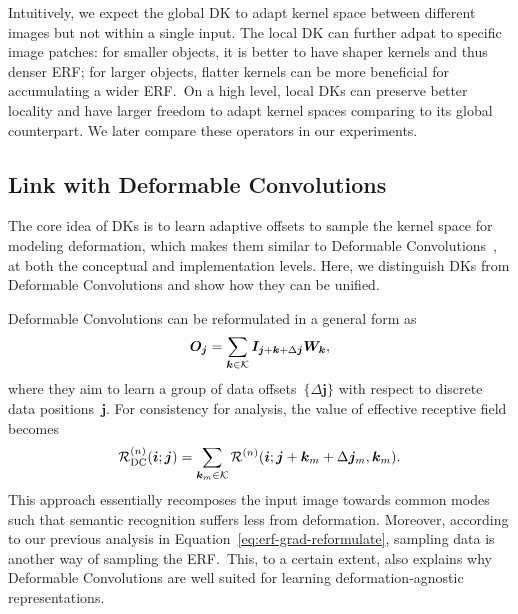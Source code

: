 \documentclass{article} \usepackage{iclr2020_conference, times}
\def\vi{{\bm{i}}}
\def\vj{{\bm{j}}}
\def\vk{{\bm{k}}}
\def\mI{{\bm{I}}}
\def\mO{{\bm{O}}}
\def\mW{{\bm{W}}}
\def\gK{{\mathcal{K}}}
\def\gR{{\mathcal{R}}}
\begin{document}
Intuitively, we expect the global DK to adapt kernel space between different
images but not within a single input.
The local DK can further adpat to specific image patches: for smaller objects,
it is better to have shaper kernels and thus denser ERF; for larger objects,
flatter kernels can be more beneficial for accumulating a wider ERF.\
On a high level, local DKs can preserve better locality and have larger freedom
to adapt kernel spaces comparing to its global counterpart.
We later compare these operators in our experiments.


\subsection{Link with Deformable Convolutions} \label{sec:dcn}
The core idea of DKs is to learn adaptive offsets to sample the kernel space for
modeling deformation, which makes them similar to Deformable
Convolutions~\citep{dai2017deformable,zhu2019deformable}, at both the conceptual and
implementation levels.
Here, we distinguish DKs from Deformable Convolutions and show how they can be unified.

Deformable Convolutions can be reformulated in a general form as
\begin{equation}
\small
    \label{eq:dc2d}
    \mO_{\vj} =
    \sum_{\vk \in \gK} \mI_{\vj + \vk + \Delta \vj} \mW_{\vk},
\end{equation}
where they aim to learn a group of data offsets~$\{\Delta \vj\}$
with respect to discrete data positions~$\vj$.
For consistency for analysis, the value of effective receptive field becomes
\begin{equation}
\small
    \label{eq:erf-grad-dc}
    \gR^{(n)}_{\text{DC}}(\vi; \vj)
    =
    \sum_{\vk_{m} \in \gK}
    \gR^{(n)}(\vi; \vj + \vk_m + \Delta \vj_m, \vk_m).
\end{equation}
This approach essentially recomposes the input image towards common modes such that
semantic recognition suffers less from deformation.
Moreover, according to our previous analysis in
Equation~\ref{eq:erf-grad-reformulate}, sampling data is another way of
sampling the ERF.\
This, to a certain extent, also explains why Deformable Convolutions are well
suited for learning deformation-agnostic representations.
\end{document}
